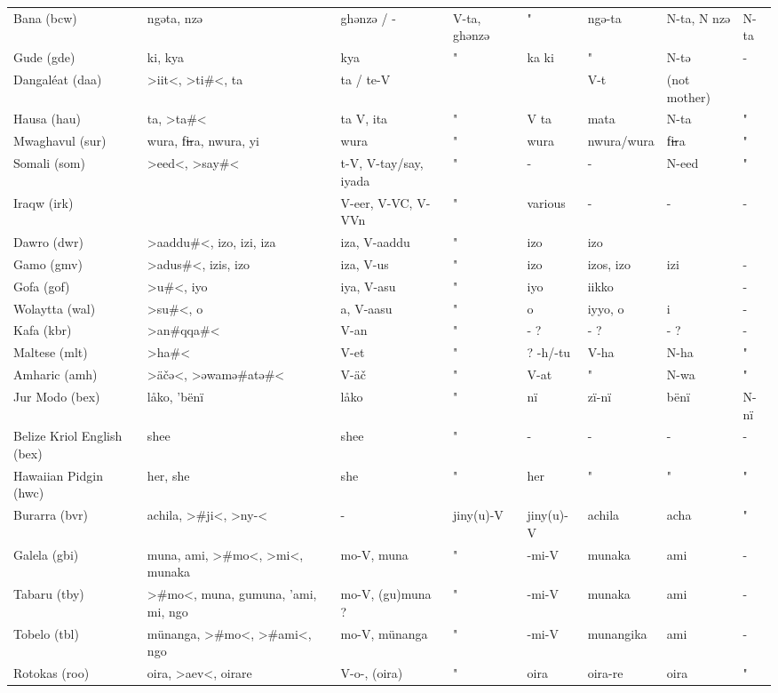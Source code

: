 \begin{landscape}
\begin{longtable}{*{8}{l}}
Bana (bcw)	&	ngəta, nzə	&	ghənzə / -	&	V-ta, ghənzə 	&	"	&	ngə-ta 	&	N-ta, N nzə 	&	N-ta	\\
Gude (gde)	&	ki, kya	&	kya	&	"	&	ka ki	&	"	&	N-tə	&	 -	\\
Dangaléat (daa)	&	>iit<, >ti\#<, ta	&	ta / te-V	&		&		&	V-t	&	 (not mother)	&		\\
Hausa (hau)	&	ta, >ta\#<	&	ta V, ita	&	"	&	V ta	&	mata	&	N-ta	&	"	\\
Mwaghavul (sur)	&	wura, fi̶ra, nwura, {yi}	&	wura	&	"	&	wura	&	nwura/wura	&	fi̶ra 	&	"	\\
Somali (som)	&	>eed<, {>say\#<}	&	t-V, V-tay/say, iyada	&	"	&	 -	&	 -	&	N-eed	&	"	\\
Iraqw (irk)	&		&	V-eer, V-VC, V-VVn	&	"	&	various	&	-	&	-	&	-	\\
Dawro (dwr)	&	>aaddu\#<, izo, izi, iza	&	iza, V-aaddu	&	"	&	izo	&	izo	&		&		\\
Gamo (gmv)	&	>adus\#<, izis, {izo}	&	iza, V-us	&	"	&	izo	&	izos, izo	&	izi	&	 -	\\
Gofa (gof)	&	>u\#<, {iyo}	&	iya, V-asu	&	"	&	iyo	&	iikko	&		&	 -	\\
Wolaytta (wal)	&	>su\#<, o	&	a, V-aasu	&	"	&	o	&	iyyo, o	&	i	&	 -	\\
Kafa (kbr)	&	>an\#<, >qqa\#<	&	V-an	&	"	&	 - ?	&	 - ?	&	 - ?	&	 -	\\
Maltese (mlt)	&	>ha\#<	&	V-et	&	"	&	? -h/-tu	&	V-ha	&	N-ha	&	"	\\
Amharic (amh)	&	>äčə<, >əwamə\#<, >atə\#<	&	V-äč	&	"	&	V-at	&	"	&	N-wa	&	"	\\
Jur Modo (bex)	&	låko, 'bënï	&	låko 	&	"	&	nï 	&	zï-nï	&	bënï	&	 N-nï	\\
Belize Kriol English (bex)	&	shee	&	shee	&	"	&	 -	&	 -	&	 -	&	 -	\\
Hawaiian Pidgin (hwc)	&	her, she	&	she	&	"	&	her	&	"	&	"	&	"	\\
Burarra (bvr)	&	achila, >\#ji<, >ny-<	&	 -	&	jiny(u)-V	&	jiny(u)-V	&	achila	&	acha	&	"	\\
Galela (gbi)	&	muna, ami, >\#mo<, >mi<, munaka	&	mo-V, muna	&	"	&	 -mi-V	&	munaka	&	ami	&	 -	\\
Tabaru (tby)	&	>\#mo<, muna, gumuna, 'ami, mi, ngo	&	mo-V, (gu)muna ?	&	"	&	 -mi-V	&	munaka	&	ami	&	 -	\\
Tobelo (tbl)	&	münanga, >\#mo<, >\#ami<, ngo	&	mo-V, münanga	&	"	&	 -mi-V	&	munangika	&	ami	&	 -	\\
Rotokas (roo)	&	oira, >aev<, oirare	&	V-o-, (oira)	&	"	&	oira	&	oira-re	&	oira	&	"	\\

\end{longtable}
\end{landscape}
